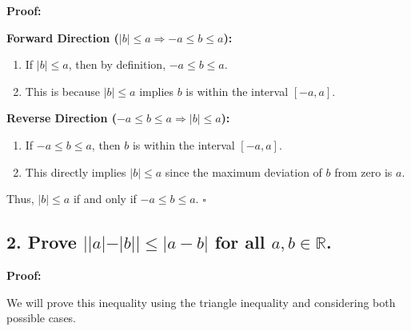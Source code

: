 \documentclass{article}
\begin{document}
\textbf{Proof:}

\textbf{Forward Direction ($|b| \leq a \Rightarrow -a \leq b \leq a$):}
\begin{enumerate}
    \item If $|b| \leq a$, then by definition, $-a \leq b \leq a$.
    \item This is because $|b| \leq a$ implies $b$ is within the interval $[-a, a]$.
\end{enumerate}

\textbf{Reverse Direction ($-a \leq b \leq a \Rightarrow |b| \leq a$):}
\begin{enumerate}
    \item If $-a \leq b \leq a$, then $b$ is within the interval $[-a, a]$.
    \item This directly implies $|b| \leq a$ since the maximum deviation of $b$ from zero is $a$.
\end{enumerate}

Thus, $|b| \leq a$ if and only if $-a \leq b \leq a$. $\square$

\subsection*{2. Prove $||a|-|b||\leq|a-b|$ for all $a,b \in \mathbb{R}$.}

\textbf{Proof:}

We will prove this inequality using the triangle inequality and considering both possible cases.
\end{document}
